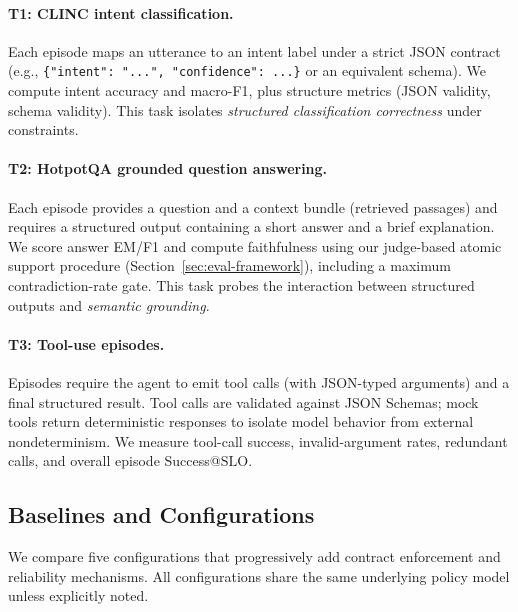 \documentclass[11pt]{article}
\newcommand{\slo}{\ensuremath{\mathrm{SLO}}}
\begin{document}
\paragraph{T1: CLINC intent classification.}
Each episode maps an utterance to an intent label under a strict JSON contract (e.g., \texttt{\{"intent": "...", "confidence": ...\}} or an equivalent schema).
We compute intent accuracy and macro-F1, plus structure metrics (JSON validity, schema validity).
This task isolates \emph{structured classification correctness} under constraints.

\paragraph{T2: HotpotQA grounded question answering.}
Each episode provides a question and a context bundle (retrieved passages) and requires a structured output containing a short answer and a brief explanation.
We score answer EM/F1 and compute faithfulness using our judge-based atomic support procedure (Section~\ref{sec:eval-framework}), including a maximum contradiction-rate gate.
This task probes the interaction between structured outputs and \emph{semantic grounding}.

\paragraph{T3: Tool-use episodes.}
Episodes require the agent to emit tool calls (with JSON-typed arguments) and a final structured result.
Tool calls are validated against JSON Schemas; mock tools return deterministic responses to isolate model behavior from external nondeterminism.
We measure tool-call success, invalid-argument rates, redundant calls, and overall episode Success@\slo.

\subsection{Baselines and Configurations}
\label{sec:baselines-configs}

We compare five configurations that progressively add contract enforcement and reliability mechanisms.
All configurations share the same underlying policy model unless explicitly noted.
\end{document}

